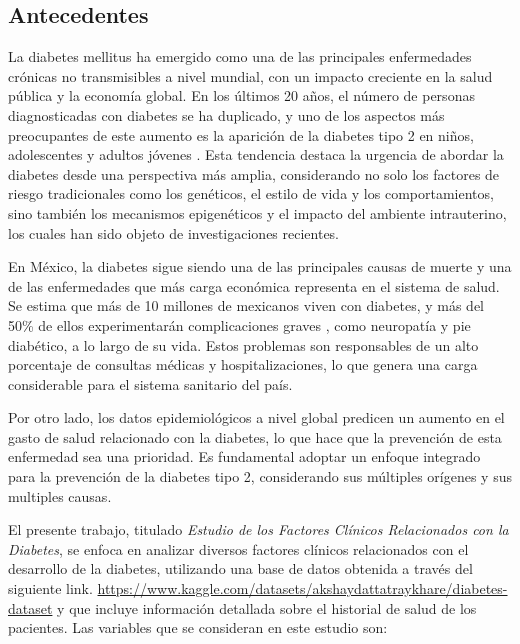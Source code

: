 \documentclass[12pt, oneside openany]{apa7}
\begin{document}
\subsection{Antecedentes}

La diabetes mellitus ha emergido como una de las principales enfermedades crónicas no transmisibles a nivel mundial, con un impacto creciente en la salud pública y la economía global. En los últimos 20 años, el número de personas diagnosticadas con diabetes se ha duplicado, y uno de los aspectos más preocupantes de este aumento es la aparición de la diabetes tipo 2 en niños, adolescentes y adultos jóvenes \parencite{ZIMMET201456}. Esta tendencia destaca la urgencia de abordar la diabetes desde una perspectiva más amplia, considerando no solo los factores de riesgo tradicionales como los genéticos, el estilo de vida y los comportamientos, sino también los mecanismos epigenéticos y el impacto del ambiente intrauterino, los cuales han sido objeto de investigaciones recientes.

En México, la diabetes sigue siendo una de las principales causas de muerte y una de las enfermedades que más carga económica representa en el sistema de salud. Se estima que más de 10 millones de mexicanos viven con diabetes, y más del 50\% de ellos experimentarán complicaciones graves \parencite{Robledo}, como neuropatía y pie diabético, a lo largo de su vida. Estos problemas son responsables de un alto porcentaje de consultas médicas y hospitalizaciones, lo que genera una carga considerable para el sistema sanitario del país.

Por otro lado, los datos epidemiológicos a nivel global predicen un aumento en el gasto de salud relacionado con la diabetes, lo que hace que la prevención de esta enfermedad sea una prioridad. Es fundamental adoptar un enfoque integrado para la prevención de la diabetes tipo 2, considerando sus múltiples orígenes y sus multiples causas. 

El presente trabajo, titulado \textit{Estudio de los Factores Clínicos Relacionados con la Diabetes}, se enfoca en analizar diversos factores clínicos relacionados con el desarrollo de la diabetes, utilizando una base de datos obtenida a través del siguiente link. \url{https://www.kaggle.com/datasets/akshaydattatraykhare/diabetes-dataset} y que incluye información detallada sobre el historial de salud de los pacientes. Las variables que se consideran en este estudio son:
\end{document}
